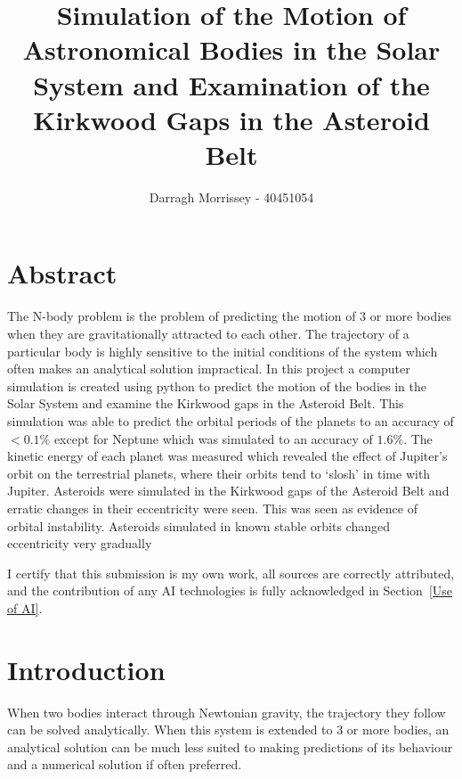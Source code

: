 \documentclass[11pt, a4paper, onecolumn]{article}
\title{Simulation of the Motion of Astronomical Bodies in the Solar System and Examination of the Kirkwood Gaps in the Asteroid Belt}
\author{Darragh Morrissey - 40451054}
\date{}
\begin{document}
\maketitle
\section{Abstract}
The N-body problem is the problem of predicting the motion of 3 or more bodies when they are gravitationally attracted to each other. 
The trajectory of a particular body is highly sensitive to the initial conditions of the system which often makes an analytical solution impractical. 
In this project a computer simulation is created using python to predict the motion of the bodies in the Solar System and examine the Kirkwood gaps in 
the Asteroid Belt. 
This simulation was able to predict the orbital periods of the planets to an accuracy of $<0.1\%$ except for Neptune which was simulated to an accuracy of $1.6\%$.
The kinetic energy of each planet was measured which revealed the effect of Jupiter's orbit on the terrestrial planets, where their orbits tend to `slosh' 
in time with Jupiter. 
Asteroids were simulated in the Kirkwood gaps of the Asteroid Belt and erratic changes in their eccentricity were seen. 
This was seen as evidence of orbital instability. 
Asteroids simulated in known stable orbits changed eccentricity very gradually 

I certify that this submission is my own work, all sources are correctly attributed, and the contribution of any AI technologies is fully acknowledged in 
Section~\ref{Use of AI}. 


\section{Introduction}
When two bodies interact through Newtonian gravity, the trajectory they follow can be solved analytically. 
When this system is extended to 3 or more bodies, an analytical solution can be much less suited to making predictions of its behaviour and a 
numerical solution if often preferred.
\end{document}
